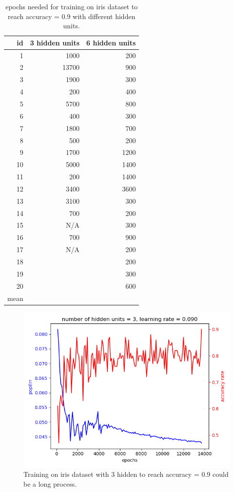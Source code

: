 \documentclass[11pt]{article}
\begin{document}
\begin{table}[htb]
\caption{epochs needed for training on iris dataset to reach accuracy = 0.9 with different hidden units.  \label{table-epochs-needed-for-accuracy}}
\centering
\begin{tabular}{rrr}
id & 3 hidden units & 6 hidden units\\
\hline
1 & 1000 & 200\\
2 & 13700 & 900\\
3 & 1900 & 300\\
4 & 200 & 400\\
5 & 5700 & 800\\
6 & 400 & 300\\
7 & 1800 & 700\\
8 & 500 & 200\\
9 & 1700 & 1200\\
10 & 5000 & 1400\\
11 & 200 & 1400\\
12 & 3400 & 3600\\
13 & 3100 & 300\\
14 & 700 & 200\\
15 & N/A & 300\\
16 & 700 & 900\\
17 & N/A & 200\\
18 &  & 200\\
19 &  & 300\\
20 &  & 600\\
\hline
mean &  & \\
\end{tabular}
\end{table}

\begin{figure}[htb]
\centering
\includegraphics[width=.9\linewidth]{./popErr_vs_accuracy_on_iris_3hidden_hard.png}
\caption{Training on iris dataset with 3 hidden to reach accuracy = 0.9 could be a long process. \label{fig-iris-hidden-3-long-process}}
\end{figure}
\end{document}
